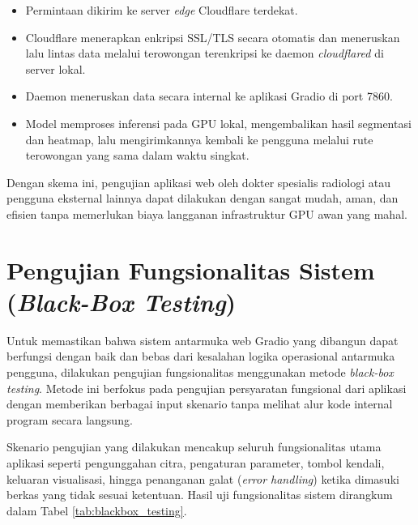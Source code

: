 \documentclass[12pt,a4paper,oneside]{book}
\begin{document}
\begin{enumerate}
    \begin{itemize}
      \item Permintaan dikirim ke server \textit{edge} Cloudflare terdekat.
      \item Cloudflare menerapkan enkripsi SSL/TLS secara otomatis dan meneruskan lalu lintas data melalui terowongan terenkripsi ke daemon \textit{cloudflared} di server lokal.
      \item Daemon meneruskan data secara internal ke aplikasi Gradio di port 7860.
      \item Model memproses inferensi pada GPU lokal, mengembalikan hasil segmentasi dan heatmap, lalu mengirimkannya kembali ke pengguna melalui rute terowongan yang sama dalam waktu singkat.
    \end{itemize}
\end{enumerate}

Dengan skema ini, pengujian aplikasi web oleh dokter spesialis radiologi atau pengguna eksternal lainnya dapat dilakukan dengan sangat mudah, aman, dan efisien tanpa memerlukan biaya langganan infrastruktur GPU awan yang mahal.

\section{Pengujian Fungsionalitas Sistem (\textit{Black-Box Testing})}

Untuk memastikan bahwa sistem antarmuka web Gradio yang dibangun dapat berfungsi dengan baik dan bebas dari kesalahan logika operasional antarmuka pengguna, dilakukan pengujian fungsionalitas menggunakan metode \textit{black-box testing}. Metode ini berfokus pada pengujian persyaratan fungsional dari aplikasi dengan memberikan berbagai input skenario tanpa melihat alur kode internal program secara langsung.

Skenario pengujian yang dilakukan mencakup seluruh fungsionalitas utama aplikasi seperti pengunggahan citra, pengaturan parameter, tombol kendali, keluaran visualisasi, hingga penanganan galat (\textit{error handling}) ketika dimasuki berkas yang tidak sesuai ketentuan. Hasil uji fungsionalitas sistem dirangkum dalam Tabel \ref{tab:blackbox_testing}.
\end{document}
